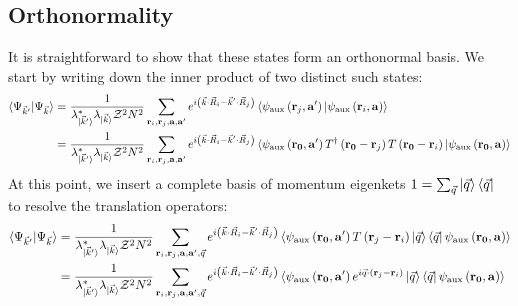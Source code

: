 \documentclass[reprint,hidelinks]{revtex4-2}
\begin{document}
\begin{widetext}
\subsection{Orthonormality}
It is straightforward to show that these states form an orthonormal basis. We start by writing down the inner product of two distinct such states:
\begin{equation}\begin{aligned}
	\braket{\Psi_{\vec k^\prime} | \Psi_{\vec k}} 
	&= \frac{1}{\lambda_{\ket{\vec k^\prime}}^* \lambda_{\ket{\vec k}} \mathcal{Z}^2 N^2}\sum_{{\bf r}_i, {\bf r}_j, {\bf a}, {\bf a}^\prime} e^{i \left(\vec{k}\cdot\vec{R}_i - \vec{k}^\prime\cdot\vec{R}_j\right) } \braket{\psi_\text{aux}\left( {\bf r}_j, {\bf a}^\prime \right) | \psi_\text{aux}\left( {\bf r}_i, {\bf a} \right)} \\
	&= \frac{1}{\lambda_{\ket{\vec k^\prime}}^* \lambda_{\ket{\vec k}} \mathcal{Z}^2 N^2}\sum_{{\bf r}_i, {\bf r}_j, {\bf a}, {\bf a}^\prime} e^{i \left(\vec{k}\cdot\vec{R}_i - \vec{k}^\prime\cdot\vec{R}_j\right) } \braket{\psi_\text{aux}\left( {\bf r_0}, {\bf a}^\prime \right) T^\dagger\left( {\bf r_0} - {\bf r}_j \right) T\left( {\bf r_0} - {\bf r}_i \right) | \psi_\text{aux}\left( {\bf r_0}, {\bf a} \right)}\\
\end{aligned}\end{equation}
At this point, we insert a complete basis of momentum eigenkets \(1 = \sum_{\vec q}\ket{\vec q}\bra{\vec q}\) to resolve the translation operators:
\begin{equation}\begin{aligned}
	\braket{\Psi_{\vec k^\prime} | \Psi_{\vec k}} &= \frac{1}{\lambda_{\ket{\vec k^\prime}}^* \lambda_{\ket{\vec k}} \mathcal{Z}^2 N^2}\sum_{{\bf r}_i, {\bf r}_j, {\bf a}, {\bf a}^\prime, \vec q} e^{i \left(\vec{k}\cdot\vec{R}_i - \vec{k}^\prime\cdot\vec{R}_j\right) } \braket{\psi_\text{aux}\left( {\bf r_0}, {\bf a}^\prime \right) T\left( {\bf r}_j - {\bf r}_i \right) \ket{\vec q}\bra{\vec q} \psi_\text{aux}\left( {\bf r_0}, {\bf a} \right)}\\
						      &= \frac{1}{\lambda_{\ket{\vec k^\prime}}^* \lambda_{\ket{\vec k}} \mathcal{Z}^2 N^2}\sum_{{\bf r}_i, {\bf r}_j, {\bf a}, {\bf a}^\prime, \vec q} e^{i \left(\vec{k}\cdot\vec{R}_i - \vec{k}^\prime\cdot\vec{R}_j\right) } \braket{\psi_\text{aux}\left( {\bf r_0}, {\bf a}^\prime \right) e^{i \vec q \cdot \left( {\bf r}_j - {\bf r}_i \right)} \ket{\vec q}\bra{\vec q} \psi_\text{aux}\left( {\bf r_0}, {\bf a} \right)} \\

\end{aligned}
\end{equation}
\end{widetext}
\end{document}
